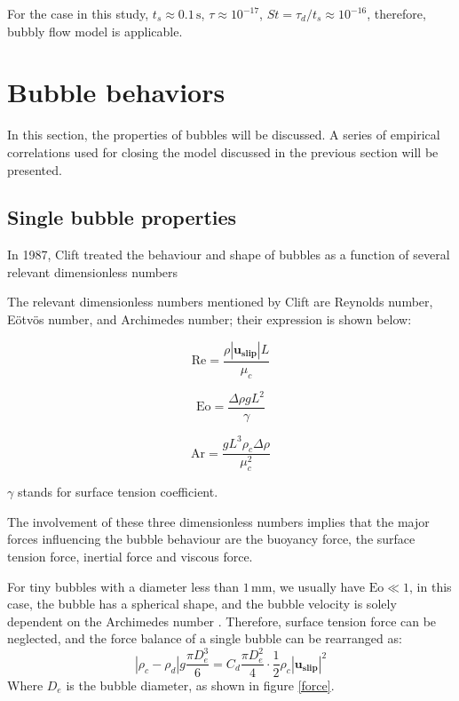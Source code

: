 For the case in this study, $t_s \approx 0.1 \, \mathrm{s}$, $\tau \approx 10^{-17}$, $St = \tau_d / t_s \approx 10^{-16}$, therefore, bubbly flow model is applicable.


\section{Bubble behaviors}\label{bubblebehavior}

In this section, the properties of bubbles will be discussed. A series of empirical correlations used for closing the model discussed in the previous section will be presented.

\subsection{Single bubble properties}

In 1987, Clift \cite{clift1978bubbles} treated the behaviour and shape of bubbles as a function of several relevant dimensionless numbers


The relevant dimensionless numbers mentioned by Clift are Reynolds number, Eötvös number, and Archimedes number; their expression is shown below:

\begin{equation}
   \mathrm{Re} = \frac{\rho |\mathbf{u_{slip}}| L}{\mu_c}
\end{equation}

\begin{equation}
    \mathrm{Eo} = \frac{\Delta \rho g L^2}{\gamma}
\end{equation}

\begin{equation}
    \mathrm{Ar} = \frac{gL^3\rho_c \Delta \rho}{\mu_c^2}
\end{equation}

$\gamma$ stands for surface tension coefficient.

The involvement of these three dimensionless numbers implies that the major forces influencing the bubble behaviour are the buoyancy force, the surface tension force, inertial force and viscous force.

For tiny bubbles with a diameter less than $1 \, \mathrm{mm}$, we usually have $ \mathrm{Eo} \ll 1$, in this case, the bubble has a spherical shape, and the bubble velocity is solely dependent on the Archimedes number \cite{batchelor2000introduction}. Therefore, surface tension force can be neglected, and the force balance of a single bubble can be rearranged as:
\begin{equation}
    |\rho_c-\rho_d|g\frac{\pi D_e ^3}{6}=C_d\frac{\pi D_e^2}{4}\cdot \frac{1}{2}\rho_c | \mathbf{ u_{slip}} |^2
\end{equation}
Where $D_e$ is the bubble diameter, as shown in figure \ref{force}.

